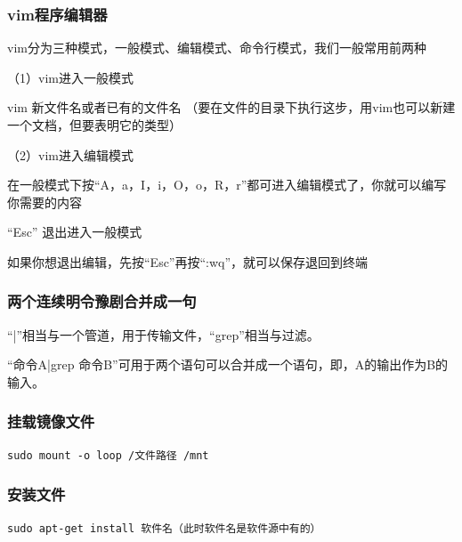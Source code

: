 \documentclass{article}
\begin{document}
\subsubsection{vim程序编辑器}
vim分为三种模式，一般模式、编辑模式、命令行模式，我们一般常用前两种

（1）vim进入一般模式

vim 新文件名或者已有的文件名  （要在文件的目录下执行这步，用vim也可以新建一个文档，但要表明它的类型）

（2）vim进入编辑模式

在一般模式下按“A，a，I，i，O，o，R，r”都可进入编辑模式了，你就可以编写你需要的内容

“Esc” 退出进入一般模式

如果你想退出编辑，先按“Esc”再按“:wq”，就可以保存退回到终端
\subsubsection{两个连续明令豫剧合并成一句}
“|”相当与一个管道，用于传输文件，“grep”相当与过滤。

“命令A|grep 命令B”可用于两个语句可以合并成一个语句，即，A的输出作为B的输入。

\subsubsection{挂载镜像文件}
\begin{lstlisting}
sudo mount -o loop /文件路径 /mnt
\end{lstlisting}
\subsubsection{安装文件}
\begin{lstlisting}
sudo apt-get install 软件名（此时软件名是软件源中有的）
\end{lstlisting}
\end{document}
